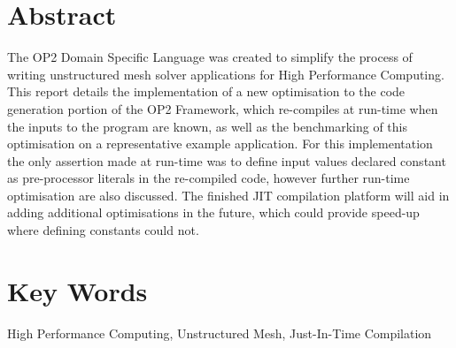 
%
\vspace*{\fill}
\begin{adjustwidth}{55pt}{55pt}

\section*{Abstract}
The OP2 Domain Specific Language was created to simplify the process of writing unstructured mesh solver applications for High Performance Computing. This report details the implementation of a new optimisation to the code generation portion of the OP2 Framework, which re-compiles at run-time when the inputs to the program are known, as well as the benchmarking of this optimisation on a representative example application. For this implementation the only assertion made at run-time was to define input values declared constant as pre-processor literals in the re-compiled code, however further run-time optimisation are also discussed. The finished JIT compilation platform will aid in adding additional optimisations in the future, which could provide speed-up where defining constants could not.

\section*{Key Words}
High Performance Computing, Unstructured Mesh, Just-In-Time Compilation
\end{adjustwidth}
\vspace*{\fill}
